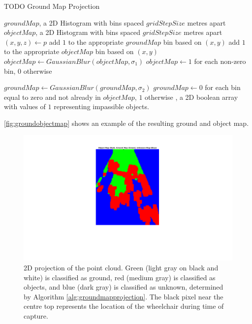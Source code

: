 \begin{algorithm}
\caption{TODO Ground Map Projection}
\label{alg:groundmapprojection}
\begin{algorithmic}[1]
\Statex
{}
    \State $groundMap$, a 2D Histogram with bins spaced $gridStepSize$ metres apart
    \State $objectMap$, a 2D Histogram with bins spaced $gridStepSize$ metres apart
        \State $(x,y,z) \gets p$
            \State add $1$ to the appropriate $groundMap$ bin based on $(x,y)$
        \Else
            \State add $1$ to the appropriate $objectMap$ bin based on $(x,y)$
        \EndIf
    \EndFor
    \State $objectMap \gets GaussianBlur(objectMap, \sigma_1)$
    \State $objectMap \gets 1$ for each non-zero bin, $0$ otherwise

    \State $groundMap \gets GaussianBlur(groundMap, \sigma_2)$
    \State $groundMap \gets 0$ for each bin equal to zero and not already in $objectMap$, $1$ otherwise
\EndFunction
\Statex
{}, a 2D boolean array with values of $1$ representing
impassible objects.
\end{algorithmic}
\end{algorithm}

\autoref{fig:groundobjectmap} shows an example of the resulting ground and
object map.

\begin{figure}
\centering
\includegraphics[width=5in]{figures/groundobjectmap.png}
\caption{2D projection of the point cloud. Green (light gray on black and white)
is classified as ground, red (medium gray) is classified as objects, and blue
(dark gray) is classified as unknown, determined by Algorithm
\autoref{alg:groundmapprojection}. The black pixel near the centre top
represents the location of the wheelchair during time of capture.}
\label{fig:groundobjectmap}
\end{figure}

